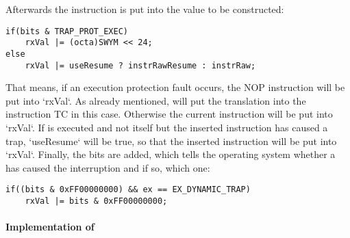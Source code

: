 Afterwards the instruction is put into the value to be constructed:
\begin{lstlisting}[language=GIMMIXC,caption={Determining \sr{X}/\sr{XX} in {\tt cpu\_triggerException}, part 2}]
if(bits & TRAP_PROT_EXEC)
	rxVal |= (octa)SWYM << 24;
else
	rxVal |= useResume ? instrRawResume : instrRaw;
\end{lstlisting}
That means, if an execution protection fault occurs, the NOP instruction  will be put into `rxVal`. As already mentioned,  will put the translation into the instruction TC in this case. Otherwise the current instruction will be put into `rxVal`. If  is executed and not  itself but the inserted instruction has caused a trap, `useResume` will be true, so that the inserted instruction will be put into `rxVal`. Finally, the  bits are added, which tells the operating system whether a  has caused the interruption and if so, which one:
\begin{lstlisting}[language=GIMMIXC,caption={Determining \sr{X}/\sr{XX} in {\tt cpu\_triggerException}, part 3}]
if((bits & 0xFF00000000) && ex == EX_DYNAMIC_TRAP)
	rxVal |= bits & 0xFF00000000;
\end{lstlisting}

\paragraph{Implementation of }

